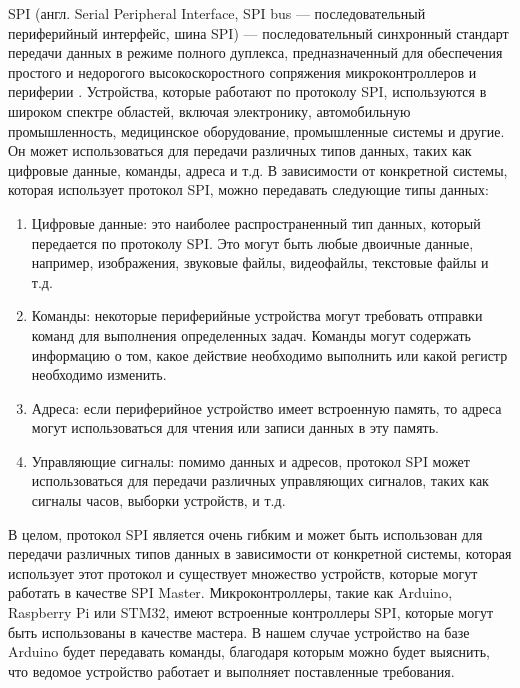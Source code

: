 \documentclass[14pt, oneside]{altsu-report}
\begin{document}
	SPI (англ. Serial Peripheral Interface, SPI bus — последовательный периферийный интерфейс, шина SPI) — последовательный синхронный стандарт передачи данных в режиме полного дуплекса, предназначенный для обеспечения простого и недорогого высокоскоростного сопряжения микроконтроллеров и периферии \cite{spi}. Устройства, которые работают по протоколу SPI, используются в широком спектре областей, включая электронику, автомобильную промышленность, медицинское оборудование, промышленные системы и другие. Он может использоваться для передачи различных типов данных, таких как цифровые данные, команды, адреса и т.д. В зависимости от конкретной системы, которая использует протокол SPI, можно передавать следующие типы данных:
	\begin{enumerate}
		\item Цифровые данные: это наиболее распространенный тип данных, который передается по протоколу SPI. Это могут быть любые двоичные данные, например, изображения, звуковые файлы, видеофайлы, текстовые файлы и т.д.
		\item Команды: некоторые периферийные устройства могут требовать отправки команд для выполнения определенных задач. Команды могут содержать информацию о том, какое действие необходимо выполнить или какой регистр необходимо изменить.
		\item Адреса: если периферийное устройство имеет встроенную память, то адреса могут использоваться для чтения или записи данных в эту память.
		\item Управляющие сигналы: помимо данных и адресов, протокол SPI может использоваться для передачи различных управляющих сигналов, таких как сигналы часов, выборки устройств, и т.д.
	\end{enumerate}	 
	
	В целом, протокол SPI является очень гибким и может быть использован для передачи различных типов данных в зависимости от конкретной системы, которая использует этот протокол и существует множество устройств, которые могут работать в качестве SPI Master. Микроконтроллеры, такие как Arduino, Raspberry Pi или STM32, имеют встроенные контроллеры SPI, которые могут быть использованы в качестве мастера. В нашем случае устройство на базе Arduino будет передавать команды, благодаря которым можно будет выяснить, что ведомое устройство работает и выполняет поставленные требования.	
\end{document}
